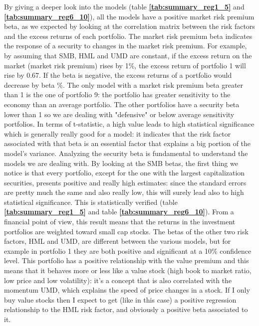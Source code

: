 \documentclass[11pt]{article}
\begin{document}
By giving a deeper look into the models (table \textbf{\ref{tab:summary_reg1_5}} and \textbf{\ref{tab:summary_reg6_10}}), all the models have a positive market risk premium beta, 
as we expected by looking at the correlation matrix between the 
risk factors and the excess returns of each portfolio. The market risk premium beta indicates the response of a security to changes in the market risk premium. For example, 
by assuming that SMB, HML and UMD are constant, if the excess return on the market (market risk premium) rises by 1\%, the excess return of portfolio 1 will rise by 0.67. 
If the beta is negative, the excess returns of a portfolio would decrease by beta \%. The only model with a market risk premium beta greater than 1 is the one of portfolio 9: 
the portfolio has greater sensitivity to the economy than an average portfolio. The other portfolios have a security beta lower than 1 so we are dealing with "defensive" or 
below average sensitivity portfolios.
In terms of t-statistic, a high value leads to high statistical significance which is generally really good for a model: it indicates that the risk factor associated with 
that beta is an essential factor that explains a big portion of the model’s variance. Analyzing the security beta is fundamental to understand the models we are dealing with.
By looking at the SMB betas, the first thing we notice is that every portfolio, except for the one with the largest capitalization securities, presents positive and really 
high estimates: since the standard errors are pretty much the same and also really low, this will surely lead also to high statistical significance. This is statistically
verified (table \textbf{\ref{tab:summary_reg1_5}} and table \textbf{\ref{tab:summary_reg6_10}}). From a financial point 
of view, this result means that the returns in the investment portfolios are weighted toward small cap stocks.\newline
The betas of the other two risk factors, HML and UMD, are different between the various models, but for example in portfolio 1 they are both positive and significant at a 
10\% confidence level. This portfolio has a positive relationship with the value premium and this means that it behaves more or less like a value stock (high book to market 
ratio, low price and low volatility): it’s a concept that is also correlated with the momentum UMD, which explains the speed of price changes in a stock. 
If I only buy value stocks then I expect to get (like in this case) a positive regression relationship to the HML risk factor, and obviously a positive beta associated to it. 
\end{document}
